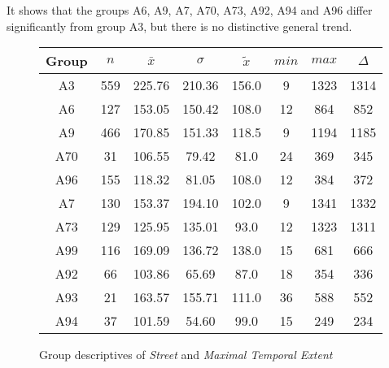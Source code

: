 It shows that the groups A6, A9, A7, A70, A73, A92, A94 and A96 differ significantly from group A3, but there is no distinctive general trend.
\begin{figure}[ht!]
	\centering
	\begin{minipage}{0.5\textwidth}
		\tiny
		\setlength{\tabcolsep}{4pt}
		\centering
		\begin{tabular}{c|c|c|c|c|c|c|c}
			\toprule
			Group & $n$ & $\bar{x}$ & $\sigma$ & $\tilde{x}$ & $min$ & $max$ & $\Delta$ \\
			\midrule
			A3  & 559 & 225.76 & 210.36 & 156.0 & 9  & 1323 & 1314 \\ 
			A6  & 127 & 153.05 & 150.42 & 108.0 & 12 & 864  & 852  \\ 
			A9  & 466 & 170.85 & 151.33 & 118.5 & 9  & 1194 & 1185 \\ 
			A70 & 31  & 106.55 & 79.42  & 81.0 & 24 & 369  & 345  \\ 
			A96 & 155 & 118.32 & 81.05  & 108.0 & 12 & 384  & 372  \\ 
			A7  & 130 & 153.37 & 194.10 & 102.0 & 9  & 1341 & 1332 \\ 
			A73 & 129 & 125.95 & 135.01 & 93.0 & 12 & 1323 & 1311 \\ 
			A99 & 116 & 169.09 & 136.72 & 138.0 & 15 & 681  & 666  \\ 
			A92 & 66  & 103.86 & 65.69  & 87.0 & 18 & 354  & 336  \\ 
			A93 & 21  & 163.57 & 155.71 & 111.0 & 36 & 588  & 552  \\ 
			A94 & 37  & 101.59 & 54.60  & 99.0 & 15 & 249  & 234  \\ 
			\bottomrule
		\end{tabular}
		\label{tbl:descriptives_baysis_matched_Str_TMax}
	\end{minipage}%
	\begin{minipage}{0.55\textwidth}
		\data
		\pgfplotstablesort[sort key=mean, sort cmp=float >]{\datasorted}{\data}
		\tiny
		\centering
		\label{fig:descriptives_baysis_matched_Str_TMax}
	\end{minipage}%
	\caption{Group descriptives of \textit{Street} and \textit{Maximal Temporal Extent}}
\end{figure}
